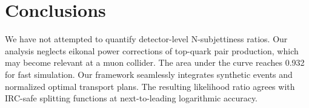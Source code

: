 \section{Conclusions}\label{sec:conclusions}

We have not attempted to quantify detector-level N-subjettiness ratios.
Our analysis neglects eikonal power corrections of top-quark pair
production, which may become relevant at a muon collider. The area under
the curve reaches 0.932 for fast simulation. Our framework seamlessly
integrates synthetic events and normalized optimal transport plans. The
resulting likelihood ratio agrees with IRC-safe splitting functions at
next-to-leading logarithmic accuracy.

